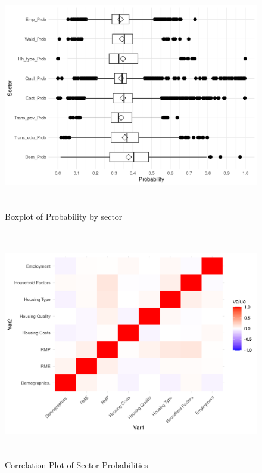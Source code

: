 \begin{figure}[htbp]
    \centering
     \includegraphics[width=1\textwidth, height=10cm]{plots/prob_sector.png}
     \caption{Boxplot of Probability by sector}
     \label{fig:prob_box}
 \end{figure}

\begin{figure}[htbp]
    \centering
     \includegraphics[width=1\textwidth, height=10cm]{plots/prob_corr.png}
     \caption{Correlation Plot of Sector Probabilities}
     \label{fig:prob_corr}
 \end{figure}

